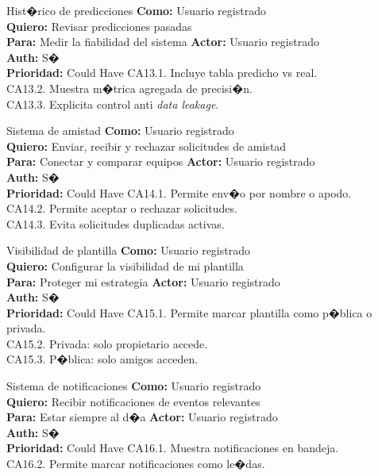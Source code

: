 {Hist�rico de predicciones}
{\textbf{Como:} Usuario registrado\\ \textbf{Quiero:} Revisar predicciones pasadas\\ \textbf{Para:} Medir la fiabilidad del sistema}
{\textbf{Actor:} Usuario registrado\\ \textbf{Auth:} S�\\ \textbf{Prioridad:} Could Have}
{CA13.1. Incluye tabla predicho vs real.\\ CA13.2. Muestra m�trica agregada de precisi�n.\\ CA13.3. Explicita control anti \textit{data leakage}.}

{Sistema de amistad}
{\textbf{Como:} Usuario registrado\\ \textbf{Quiero:} Enviar, recibir y rechazar solicitudes de amistad\\ \textbf{Para:} Conectar y comparar equipos}
{\textbf{Actor:} Usuario registrado\\ \textbf{Auth:} S�\\ \textbf{Prioridad:} Could Have}
{CA14.1. Permite env�o por nombre o apodo.\\ CA14.2. Permite aceptar o rechazar solicitudes.\\ CA14.3. Evita solicitudes duplicadas activas.}

{Visibilidad de plantilla}
{\textbf{Como:} Usuario registrado\\ \textbf{Quiero:} Configurar la visibilidad de mi plantilla\\ \textbf{Para:} Proteger mi estrategia}
{\textbf{Actor:} Usuario registrado\\ \textbf{Auth:} S�\\ \textbf{Prioridad:} Could Have}
{CA15.1. Permite marcar plantilla como p�blica o privada.\\ CA15.2. Privada: solo propietario accede.\\ CA15.3. P�blica: solo amigos acceden.}

{Sistema de notificaciones}
{\textbf{Como:} Usuario registrado\\ \textbf{Quiero:} Recibir notificaciones de eventos relevantes\\ \textbf{Para:} Estar siempre al d�a}
{\textbf{Actor:} Usuario registrado\\ \textbf{Auth:} S�\\ \textbf{Prioridad:} Could Have}
{CA16.1. Muestra notificaciones en bandeja.\\ CA16.2. Permite marcar notificaciones como le�das.}

